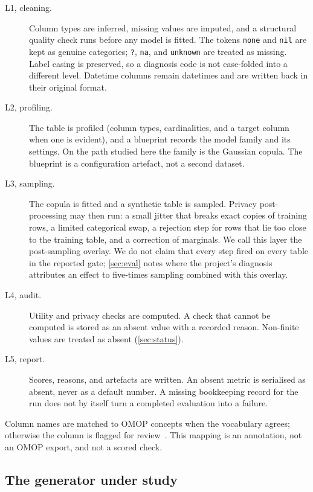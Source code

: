 \documentclass[11pt,a4paper]{article}
\begin{document}
\begin{description}
  \item[L1, cleaning.] Column types are inferred, missing values are imputed, and a structural quality check runs before any model is fitted. The tokens \texttt{none} and \texttt{nil} are kept as genuine categories; \texttt{?}, \texttt{na}, and \texttt{unknown} are treated as missing. Label casing is preserved, so a diagnosis code is not case-folded into a different level. Datetime columns remain datetimes and are written back in their original format.
  \item[L2, profiling.] The table is profiled (column types, cardinalities, and a target column when one is evident), and a blueprint records the model family and its settings. On the path studied here the family is the Gaussian copula. The blueprint is a configuration artefact, not a second dataset.
  \item[L3, sampling.] The copula is fitted and a synthetic table is sampled. Privacy post-processing may then run: a small jitter that breaks exact copies of training rows, a limited categorical swap, a rejection step for rows that lie too close to the training table, and a correction of marginals. We call this layer the post-sampling overlay. We do not claim that every step fired on every table in the reported gate; \cref{sec:eval} notes where the project's diagnosis attributes an effect to five-times sampling combined with this overlay.
  \item[L4, audit.] Utility and privacy checks are computed. A check that cannot be computed is stored as an absent value with a recorded reason. Non-finite values are treated as absent (\cref{sec:status}).
  \item[L5, report.] Scores, reasons, and artefacts are written. An absent metric is serialised as absent, never as a default number. A missing bookkeeping record for the run does not by itself turn a completed evaluation into a failure.
\end{description}

Column names are matched to OMOP concepts when the vocabulary agrees; otherwise the column is flagged for review~\cite{hripcsak2015}. This mapping is an annotation, not an OMOP export, and not a scored check.

\subsection{The generator under study}\label{sec:generator}
\end{document}
